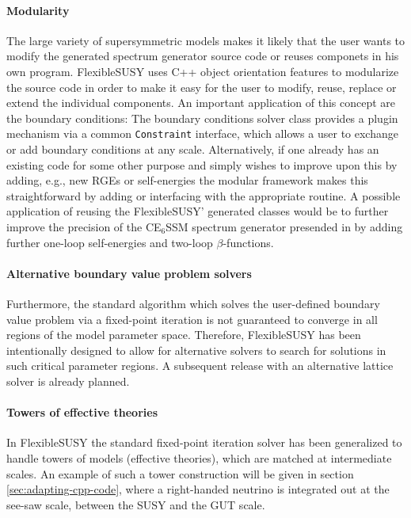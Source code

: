 \documentclass[final,3p,11pt,pdflatex]{elsarticle}
\makeatletter
\newcommand{\fs}{FlexibleSUSY\@\xspace}
\newcommand{\code}[1]{\lstinline|#1|}  %
\makeatother
\begin{document}
\paragraph{Modularity}

The large variety of supersymmetric models makes it likely that the
user wants to modify the generated spectrum generator source code or
reuses componets in his own program. \fs uses C++ object orientation
features to modularize the source code in order to make it easy for
the user to modify, reuse, replace or extend the individual
components.  An important application of this concept are the boundary
conditions: The boundary conditions solver class provides a plugin
mechanism via a common \code{Constraint} interface, which allows a
user to exchange or add boundary conditions at any scale.
Alternatively, if one already has an existing code for some other
purpose and simply wishes to improve upon this by adding, e.g., new
RGEs or self-energies the modular framework makes this straightforward
by adding or interfacing with the appropriate routine.  A possible
application of reusing the \fs' generated classes would be to further
improve the precision of the CE$_6$SSM spectrum generator presended in
\cite{Athron:2009bs,Athron:2012pw} by adding further one-loop
self-energies and two-loop $\beta$-functions.

\paragraph{Alternative boundary value problem solvers}

Furthermore, the standard algorithm which solves the user-defined
boundary value problem via a fixed-point iteration is not guaranteed
to converge in all regions of the model parameter space.  Therefore,
\fs has been intentionally designed to allow for alternative solvers
to search for solutions in such critical parameter regions.  A
subsequent release with an alternative lattice solver is already
planned.

\paragraph{Towers of effective theories}

In \fs the standard fixed-point iteration solver has been generalized
to handle towers of models (effective theories), which are matched at
intermediate scales.  An example of such a tower construction will be
given in section \ref{sec:adapting-cpp-code}, where a right-handed
neutrino is integrated out at the see-saw scale, between the SUSY and
the GUT scale.
\end{document}
